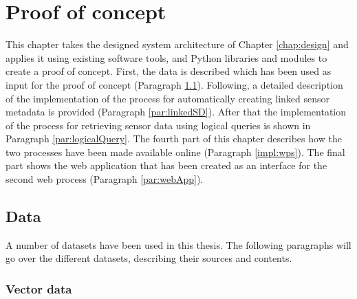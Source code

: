 \chapter{Proof of concept}
\label{chap:impl}
This chapter takes the designed system architecture of Chapter \ref{chap:design} and applies it using existing software tools, and Python libraries and modules to create a proof of concept. First, the data is described which has been used as input for the proof of concept (Paragraph \ref{chap:data}). Following, a detailed description of the implementation of the process for automatically creating linked sensor metadata is provided (Paragraph \ref{par:linkedSD}). After that the implementation of the process for retrieving sensor data using logical queries is shown in Paragraph \ref{par:logicalQuery}. The fourth part of this chapter describes how the two processes have been made available online (Paragraph \ref{impl:wps}). The final part shows the web application that has been created as an interface for the second web process (Paragraph \ref{par:webApp}).

\section{Data}
\label{chap:data}

A number of datasets have been used in this thesis. The following paragraphs will go over the different datasets, describing their sources and contents. 

\subsection{Vector data}
